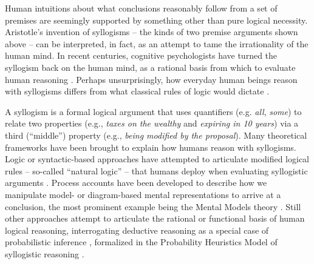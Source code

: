 \documentclass[floatsintext, doc]{apa6}
\begin{document}
Human intuitions about what conclusions reasonably follow from a set of premises are seemingly supported by something other than pure logical necessity. %
Aristotle's invention of syllogisms -- the kinds of two premise arguments shown above --  can be interpreted, in fact, as an attempt to tame the irrationality of the human mind.
In recent centuries, cognitive psychologists have turned the syllogism back on the human mind, as a rational basis from which to evaluate human reasoning \cite{Storring1908}.
Perhaps unsurprisingly, how everyday human beings reason with syllogisms differs from what classical rules of logic would dictate \cite<for a meta-analysis, see:>{Khemlani2012}.




A syllogism is a formal logical argument that uses quantifiers (e.g. \emph{all}, \emph{some}) to relate two properties (e.g., \emph{taxes on the wealthy} and \emph{expiring in 10 years}) via a third (``middle'') property (e.g., \emph{being modified by the proposal}). 
Many theoretical frameworks have been brought to explain how humans reason with syllogisms.
Logic or syntactic-based approaches have attempted to articulate modified logical rules -- so-called ``natural logic'' -- that humans deploy when evaluating syllogistic arguments \cite{braine1983logical, rips1994, geurts2003reasoning}.
Process accounts have been developed to describe how we manipulate  model- or diagram-based mental representations to arrive at a conclusion, the most prominent example being the Mental Models theory \cite{johnson1975models}.
Still other approaches attempt to articulate the rational or functional basis of human logical reasoning, interrogating deductive reasoning as a special case of probabilistic inference \cite{oaksford2001probabilistic, oaksford2007bayesian, hahn2007rationality, tenenbaum2006theory},  formalized in the Probability Heuristics Model of syllogistic reasoning \cite{Chater1999}.
\end{document}
